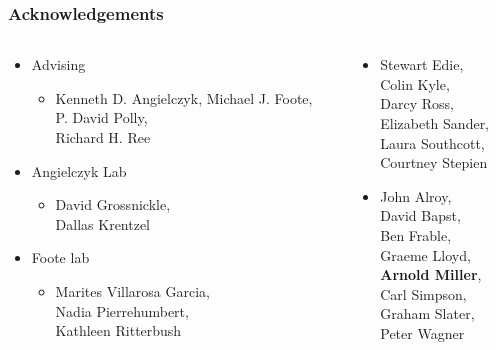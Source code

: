 \documentclass{beamer}
\begin{document}
\begin{frame}
  \frametitle{Acknowledgements}
  \begin{columns}
    \begin{column}{0.5\textwidth}
      \begin{itemize}
        \item Advising
          \begin{itemize}
            \item Kenneth D. Angielczyk, Michael J. Foote, \\P. David Polly, \\Richard H. Ree
          \end{itemize}
        \item Angielczyk Lab
          \begin{itemize}
            \item {\small{David Grossnickle, \\Dallas Krentzel}}
          \end{itemize}
        \item Foote lab
          \begin{itemize}
            \item {\small{Marites Villarosa Garcia, \\Nadia Pierrehumbert, \\Kathleen Ritterbush}}
          \end{itemize}
      \end{itemize}
    \end{column}
    \begin{column}{0.5\textwidth}
      \begin{itemize}
        \item {\footnotesize{Stewart Edie, \\Colin Kyle, \\Darcy Ross, \\Elizabeth Sander, \\Laura Southcott, \\Courtney Stepien}}
        \item {\footnotesize{John Alroy, \\David Bapst, \\Ben Frable, \\Graeme Lloyd, \\\textbf{Arnold Miller}, \\Carl Simpson, \\Graham Slater, \\Peter Wagner}}
      \end{itemize}
    \end{column}
  \end{columns}
\end{frame}

\appendix
\end{document}
